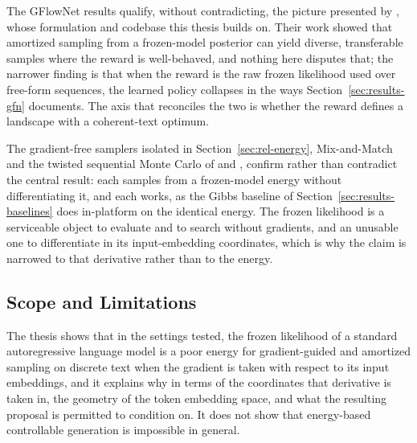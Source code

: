 The GFlowNet results qualify, without contradicting, the picture presented by \citet{hu2024amortizing}, whose formulation and codebase this thesis builds on. Their work showed that amortized sampling from a frozen-model posterior can yield diverse, transferable samples where the reward is well-behaved, and nothing here disputes that; the narrower finding is that when the reward is the raw frozen likelihood used over free-form sequences, the learned policy collapses in the ways Section~\ref{sec:results-gfn} documents. The axis that reconciles the two is whether the reward defines a landscape with a coherent-text optimum.

The gradient-free samplers isolated in Section~\ref{sec:rel-energy}, Mix-and-Match \citep{mireshghallah2022mixmatch} and the twisted sequential Monte Carlo of \citet{lew2023sequential} and \citet{zhao2024probabilistic}, confirm rather than contradict the central result: each samples from a frozen-model energy without differentiating it, and each works, as the Gibbs baseline of Section~\ref{sec:results-baselines} does in-platform on the identical energy. The frozen likelihood is a serviceable object to evaluate and to search without gradients, and an unusable one to differentiate in its input-embedding coordinates, which is why the claim is narrowed to that derivative rather than to the energy.

\subsection{Scope and Limitations}
\label{sec:disc-scope}

The thesis shows that in the settings tested, the frozen likelihood of a standard autoregressive language model is a poor energy for gradient-guided and amortized sampling on discrete text when the gradient is taken with respect to its input embeddings, and it explains why in terms of the coordinates that derivative is taken in, the geometry of the token embedding space, and what the resulting proposal is permitted to condition on. It does not show that energy-based controllable generation is impossible in general.

